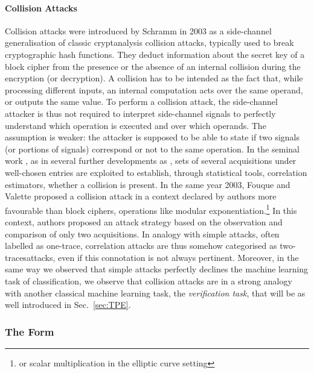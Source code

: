 \paragraph{Collision Attacks}
Collision attacks were introduced by Schramm \etal in 2003 \cite{schramm2003new} as a side-channel generalisation of classic cryptanalysis collision attacks, typically used to break cryptographic hash functions. They deduct information about the secret key of a block cipher from the presence or the absence of an internal collision during the encryption (or decryption). A collision has to be intended as the fact that, while processing different inputs, an internal computation acts over the same operand, or outputs the same value. To perform a collision attack, the side-channel attacker is thus not required to interpret side-channel signals to perfectly understand which operation is executed and over which operands. The assumption is weaker: the attacker is supposed to be able to state if two signals (or portions of signals) correspond or not to the same operation. In the seminal work \cite{schramm2003new}, as in several further developments as \cite{schramm2004collision,bogdanov2007improved,bogdanov2008multiple}, sets of several acquisitions under well-chosen entries are exploited to establish, through statistical tools, \eg correlation estimators, whether a collision is present. In the same year 2003, Fouque and Valette \cite{fouque2003doubling} proposed a collision attack in a context declared by authors more favourable than block ciphers, \ie operations like modular exponentiation.\footnote{or scalar multiplication in the elliptic curve setting} In this context, authors proposed an attack strategy based on the observation and comparison of only two acquisitions. In analogy with simple attacks, often labelled as \textquotedbl one-trace\textquotedbl , correlation attacks are thus somehow categorised as \textquotedbl two-traces\textquotedbl attacks, even if this connotation is not always pertinent. Moreover, in the same way we observed that simple attacks perfectly declines the machine learning task of classification, we observe that collision attacks are in a strong analogy with another classical machine learning task, \ie the \emph{verification task}, that will be as well introduced in Sec.~\ref{sec:TPE}.


\subsubsection{The Form}


